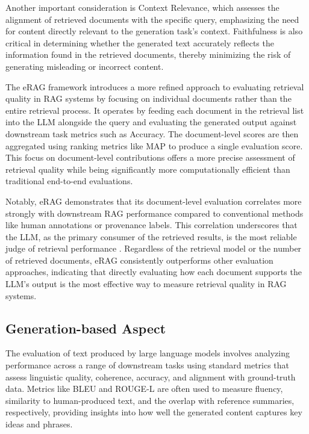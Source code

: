 Another important consideration is Context Relevance, which assesses the alignment of retrieved documents with the specific query, emphasizing the need for content directly relevant to the generation task’s context. Faithfulness \cite{es2023ragas} is also critical in determining whether the generated text accurately reflects the information found in the retrieved documents, thereby minimizing the risk of generating misleading or incorrect content.

The eRAG framework \cite{salemi2024evaluating} introduces a more refined approach to evaluating retrieval quality in RAG systems by focusing on individual documents rather than the entire retrieval process. It operates by feeding each document in the retrieval list into the LLM alongside the query and evaluating the generated output against downstream task metrics such as Accuracy. The document-level scores are then aggregated using ranking metrics like MAP to produce a single evaluation score. This focus on document-level contributions offers a more precise assessment of retrieval quality while being significantly more computationally efficient than traditional end-to-end evaluations.

Notably, eRAG demonstrates that its document-level evaluation correlates more strongly with downstream RAG performance compared to conventional methods like human annotations or provenance labels. This correlation underscores that the LLM, as the primary consumer of the retrieved results, is the most reliable judge of retrieval performance \cite{salemi2024evaluating}. Regardless of the retrieval model or the number of retrieved documents, eRAG consistently outperforms other evaluation approaches, indicating that directly evaluating how each document supports the LLM’s output is the most effective way to measure retrieval quality in RAG systems.

\subsection{Generation-based Aspect}
The evaluation of text produced by large language models involves analyzing performance across a range of downstream tasks using standard metrics that assess linguistic quality, coherence, accuracy, and alignment with ground-truth data. Metrics like BLEU \cite{10.3115/1073083.1073135} and ROUGE-L \cite{lin-2004-rouge} are often used to measure fluency, similarity to human-produced text, and the overlap with reference summaries, respectively, providing insights into how well the generated content captures key ideas and phrases.

